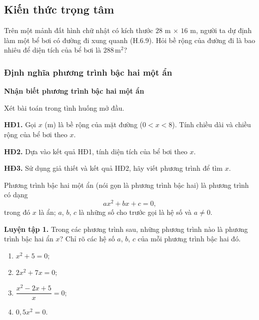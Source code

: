 \begin{lesson}
    \subsection{Kiến thức trọng tâm}

    Trên một mảnh đất hình chữ nhật có kích thước $28$ m $\times$ $16$ m, người ta dự định làm một bể bơi có đường đi xung quanh (H.6.9). Hỏi bề rộng của đường đi là bao nhiêu để diện tích của bể bơi là $288\,\text{m}^2$?


    \subsubsection{Định nghĩa phương trình bậc hai một ẩn}

    \textbf{Nhận biết phương trình bậc hai một ẩn}

    Xét bài toán trong tình huống mở đầu.

    \textbf{HĐ1.} Gọi $x$ (m) là bề rộng của mặt đường ($0<x<8$). Tính chiều dài và chiều rộng của bể bơi theo $x$.

    \answerline
    \answerline

    \textbf{HĐ2.} Dựa vào kết quả HĐ1, tính diện tích của bể bơi theo $x$.

    \answerline
    \answerline

    \textbf{HĐ3.} Sử dụng giả thiết và kết quả HĐ2, hãy viết phương trình để tìm $x$.

    \answerline
    \answerline

    \begin{keyconcept}
        Phương trình bậc hai một ẩn (nói gọn là phương trình bậc hai) là phương trình có dạng
        \[
            ax^2+bx+c=0,
        \]
        trong đó $x$ là ẩn; $a$, $b$, $c$ là những số cho trước gọi là hệ số và $a\ne0$.
    \end{keyconcept}

    \textbf{Luyện tập 1.} Trong các phương trình sau, những phương trình nào là phương trình bậc hai ẩn $x$? Chỉ rõ các hệ số $a$, $b$, $c$ của mỗi phương trình bậc hai đó.
    \begin{enumerate}[label=\alph*)]
        \item $x^2+5=0$;
        \item $2x^2+7x=0$;
        \item $\dfrac{x^2-2x+5}{x}=0$;
        \item $0{,}5x^2=0$.
    \end{enumerate}


\end{lesson}
